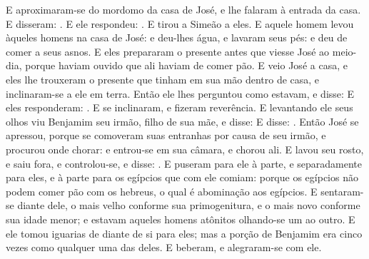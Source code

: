 {{  E aproximaram-se do mordomo da casa de José, e lhe falaram à entrada da casa.
  E disseram: .
  E ele respondeu: . E tirou a Simeão a eles.
  E aquele homem levou àqueles homens na casa de José: e deu-lhes água, e lavaram seus pés: e deu de comer a seus asnos.
  E eles prepararam o presente antes que viesse José ao meio-dia, porque haviam ouvido que ali haviam de comer pão.
  E veio José a casa, e eles lhe trouxeram o presente que tinham em sua mão dentro de casa, e inclinaram-se a ele em terra.
  Então ele lhes perguntou como estavam, e disse: 
  E eles responderam: . E se inclinaram, e fizeram reverência. %
  E levantando ele seus olhos viu Benjamim seu irmão, filho de sua mãe, e disse:  E disse: .
  Então José se apressou, porque se comoveram suas entranhas por causa de seu irmão, e procurou onde chorar: e entrou-se em sua câmara, e chorou ali.
  E lavou seu rosto, e saiu fora, e controlou-se, e disse: .
  E puseram para ele à parte, e separadamente para eles, e à parte para os egípcios que com ele comiam: porque os egípcios não podem comer pão com os hebreus, o qual é abominação aos egípcios.
  E sentaram-se diante dele, o mais velho conforme sua primogenitura, e o mais novo conforme sua idade menor; e estavam aqueles homens atônitos olhando-se um ao outro.
  E ele tomou iguarias de diante de si para eles; mas a porção de Benjamim era cinco vezes como qualquer uma das deles. E beberam, e alegraram-se com ele.
\par }

}
